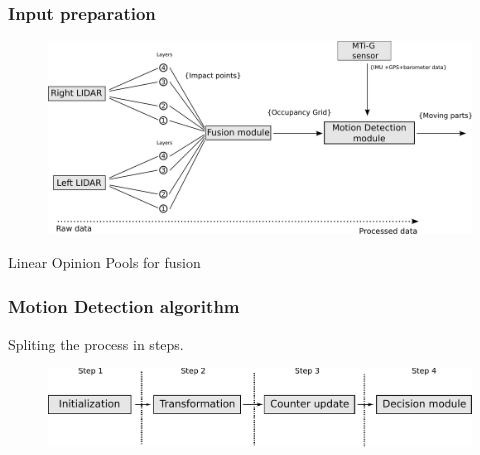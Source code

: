 \documentclass{beamer}
\begin{document}
	\begin{frame}
		\frametitle{Input preparation}
		\begin{figure}[h]
			\center
			\includegraphics[scale=0.18]{../img/fig:motion:framework}
		\end{figure}
		
		Linear Opinion Pools for fusion \cite{ADARVE-2012-671211}
	
	\end{frame}

	\begin{frame}
		\frametitle{Motion Detection algorithm}

		Spliting the process in steps.

		\begin{figure}[h]
			\center
			\includegraphics[scale=0.50]{img/fig:motion:overview:02}
		\end{figure}
		
	\end{frame}	
\end{document}
